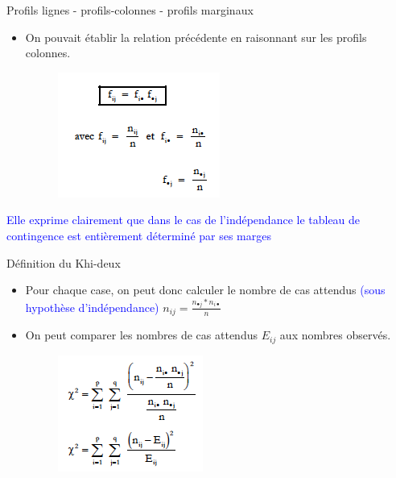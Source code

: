 \documentclass[12pt]{beamer}
\begin{document}
\begin{frame}{Profils lignes - profils-colonnes - profils
marginaux}

\begin{itemize}
\item  On pouvait établir la relation précédente en raisonnant sur les profils colonnes.
 
\begin{figure}
\includegraphics[scale=0.7]{Exemple5.png}  
\end{figure}
\end{itemize}

\textcolor{blue}{Elle exprime clairement que dans le cas de l’indépendance le tableau de contingence est entièrement déterminé par ses marges
}
\end{frame}

\begin{frame}{Définition du Khi-deux}
\begin{itemize}
\item Pour chaque case, on peut donc calculer le nombre de cas attendus \textcolor{blue}{(sous hypothèse d’indépendance)}
$n_{ij}=\frac{n_{\bullet j}*n_{i \bullet}}{n} $

\item On peut comparer les nombres de cas attendus $E_{ij}$ aux nombres observés.

\begin{figure}
\includegraphics[scale=0.8]{Exemple6.png}  
\end{figure}
\end{itemize}
\end{frame}
\end{document}
